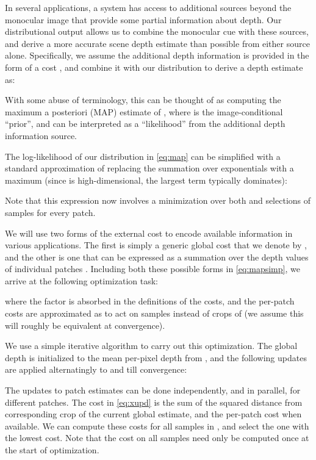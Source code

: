 \documentclass[10pt,twocolumn,letterpaper]{article}
\begin{document}
In several applications, a system has access to additional sources beyond the monocular image that provide some partial information about depth. Our distributional output allows us to combine the monocular cue with these sources, and derive a more accurate scene depth estimate  than possible from either source alone. Specifically, we assume the additional depth information is provided in the form of a cost , and combine it with our distribution  to derive a depth estimate  as:

With some abuse of terminology, this can be thought of as computing the maximum a posteriori (MAP) estimate of , where  is the image-conditional ``prior'', and  can be interpreted as a ``likelihood'' from the additional depth information source.

The log-likelihood of our distribution in \eqref{eq:map} can be simplified with a standard approximation of replacing the summation over exponentials with a maximum (since  is high-dimensional, the largest term typically dominates):

Note that this expression now involves a minimization over both  and selections of samples  for every patch.

We will use two forms of the external cost  to encode available information in various applications. The first is simply a generic global cost that we denote by , and the other is one that can be expressed as a summation over the depth values of individual patches . Including both these possible forms in \eqref{eq:mapsimp}, we arrive at the following optimization task:

where the factor  is absorbed in the definitions of the costs, and the per-patch costs  are approximated as  to act on samples instead of crops of  (we assume this will roughly be equivalent at convergence).

We use a simple iterative algorithm to carry out this optimization. The global depth  is initialized to the mean per-pixel depth from , and the following updates are applied alternatingly to  and  till convergence:



The updates to patch estimates  can be done independently, and in parallel, for different patches. The cost in \eqref{eq:xupd} is the sum of the squared distance from corresponding crop   of the current global estimate, and the per-patch cost  when available. We can compute these costs for all samples in , and select the one with the lowest cost. Note that the cost  on all samples need only be computed once at the start of optimization.
\end{document}
